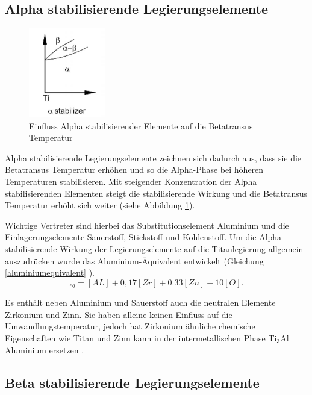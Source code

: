 \documentclass[a4paper, 11pt]{tubsreprt}
\begin{document}
\subsection{Alpha stabilisierende Legierungselemente}
\begin{figure}[h]
\includegraphics[width=0.3\textwidth]{Bilder/alphastabilisierendelegierungselemente.png}

\caption[Einfluss Alpha stabilisierender Elemente auf die Betatransus Temperatur]{Einfluss Alpha stabilisierender Elemente auf die Betatransus Temperatur \cite{Luetjering2007}}
\label{Alpha stabilisierende Legierungselemente}
\end{figure}
Alpha stabilisierende Legierungselemente zeichnen sich dadurch aus, dass sie die Betatransus Temperatur erhöhen und so die Alpha-Phase bei höheren Temperaturen stabilisieren. Mit steigender Konzentration der Alpha stabilisierenden Elementen steigt die stabilisierende Wirkung und die Betatransus Temperatur erhöht sich weiter (siehe Abbildung \ref{Alpha stabilisierende Legierungselemente}).

Wichtige Vertreter sind hierbei das Substitutionselement Aluminium und die Einlagerungselemente Sauerstoff, Stickstoff und Kohlenstoff.
Um die Alpha stabilisierende Wirkung der Legierungselemente auf die Titanlegierung allgemein auszudrücken wurde das Aluminium-Äquivalent entwickelt (Gleichung \ref{aluminiumequivalent} \cite{Luetjering2007}).
\begin{equation}
[AL]_{eq}=[AL]+0,17[Zr]+0.33[Zn]+10[O].
\label{aluminiumequivalent}
\end{equation}

Es enthält neben Aluminium und Sauerstoff auch die neutralen Elemente Zirkonium und Zinn. Sie haben alleine keinen Einfluss auf die Umwandlungstemperatur, jedoch hat Zirkonium ähnliche chemische Eigenschaften wie Titan und Zinn kann in der intermetallischen Phase Ti$_{3}$Al Aluminium ersetzen \cite{Luetjering2007}.
\subsection{Beta stabilisierende Legierungselemente}\label{Kapitel Betastabilisierende Legierungselemente}
\end{document}
